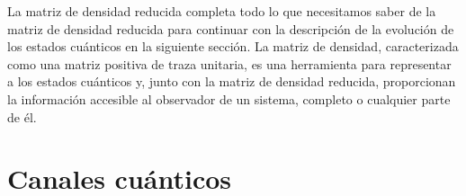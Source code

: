
La matriz de densidad reducida completa todo lo que necesitamos 
saber de la matriz de densidad reducida para continuar con la descripción
de la evolución de los estados cuánticos en la siguiente sección. 
La matriz de densidad, caracterizada como una matriz positiva de traza unitaria, 
es una herramienta para representar a los estados cuánticos y, junto 
con la matriz de densidad reducida, proporcionan 
la información accesible al observador de un sistema, 
completo o cualquier parte de él. 

\section{Canales cuánticos}\label{sec:qtm-channels}

